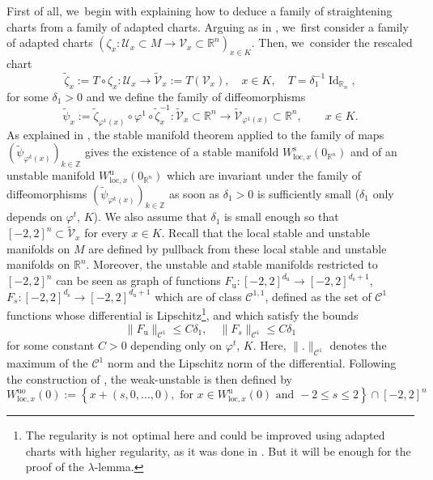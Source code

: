 \documentclass[11pt]{article}
\newcommand{\loc}{\mathrm{loc}}
\newcommand{\rs}{\mathrm{s}}
\newcommand{\ru}{\mathrm{u}}
\newcommand{\ruo}{\mathrm{uo}}
\theoremstyle{definition}
\theoremstyle{plain}
\newcommand{\Ccal}{\mathcal{C}}
\newcommand{\R}{\mathbb{R}}
\newcommand{\Ucal}{\mathcal{U}}
\newcommand{\Vcal}{\mathcal{V}}
\newcommand{\Z}{\mathbb{Z}}
\DeclareMathOperator{\Id}{Id}
\begin{document}
\begin{appendix}
First of all, we~begin with explaining how to deduce a family of straightening charts from a family of adapted charts. Arguing as in \cite[p.\,36]{dyatlov}, we~first consider a family of adapted charts $\left(\zeta_x: \Ucal_x \subset M \to \Vcal_x \subset \R^n \right)_{x \in K}$. Then, we~consider the rescaled chart
\[
\widetilde{\zeta}_x:= T \circ \zeta_x: \Ucal_x \to \widetilde{ \Vcal}_{x}:= T\left(\Vcal_{x} \right), \quad x \in K, \quad T = \delta_1^{-1} \Id_{\R_n},
\]
for some $\delta_1 > 0$ and we define the family of diffeomorphisms
\[
\widetilde{\psi}_x:= \widetilde{\zeta}_{\varphi^1 (x)} \circ \varphi^1 \circ \widetilde{\zeta}_{x}^{-1}: \widetilde{\Vcal}_x \subset \R^n \to \widetilde{\Vcal}_{\varphi^1 (x)} \subset \R^n, \qquad x \in K.
\]
As explained in \cite[\S 3.4]{dyatlov}, the stable manifold theorem applied to the family of maps $(\widetilde{\psi}_{\varphi^k (x)})_{k \in \Z}$ gives the existence of a stable manifold $W_{\loc,x}^\rs (0_{\R^n})$ and of an unstable manifold $W_{\loc,x}^\ru (0_{\R^n})$ which are invariant under the family of diffeomorphisms $(\widetilde{\psi}_{\varphi^k (x)})_{k \in \Z}$ as soon as $\delta_1 > 0$ is sufficiently small ($\delta_1$ only depends on $\varphi^t$, $K$). We also assume that $\delta_1$ is small enough so that $[-2,2]^n \subset \widetilde{\Vcal}_x$ for every $x \in K$. Recall that the local stable and unstable manifolds on $M$ are defined by pullback from these local stable and unstable manifolds on $\R^n$.
Moreover, the unstable and stable manifolds restricted to $[-2,2]^n$ can be seen as graph of functions $F_\ru: [-2,2]^{d_\ru} \to [-2,2]^{d_\rs + 1}$, $F_s: [-2,2]^{d_\rs} \to [-2,2]^{d_\ru + 1}$ which are of class $\Ccal^{1,1}$, defined as the set of $\Ccal^1$ functions whose differential is Lipschitz\footnote{The regularity is not optimal here and could be improved using adapted charts with higher regularity, as it was done in \cite{dyatlov}. But it will be enough for the proof of the $\lambda$-lemma.}, and which satisfy the bounds
\begin{equation}\label{eq: bound Fu and Fs}
\| F_\ru \|_{\Ccal^{1}} \leq C \delta_1, \quad \| F_s \|_{\Ccal^{1}} \leq C \delta_1
\end{equation}
for some constant $C > 0$ depending only on $\varphi^t$, $K$. Here, $\|.\|_{\Ccal^{1}}$ denotes the maximum of the $\Ccal^1$ norm and the Lipschitz norm of the differential. Following the construction of \cite{dyatlov}, the weak-unstable is then defined by
\[
W_{\loc,x}^{\ruo} (0):= \left\{ x + (s,0,\dots, 0), \text{ for } x \in W_{\loc,x}^\ru (0) \text{ and } -2 \leq s \leq 2 \right\} \cap [-2,2]^n
\]
\end{appendix}
\end{document}
